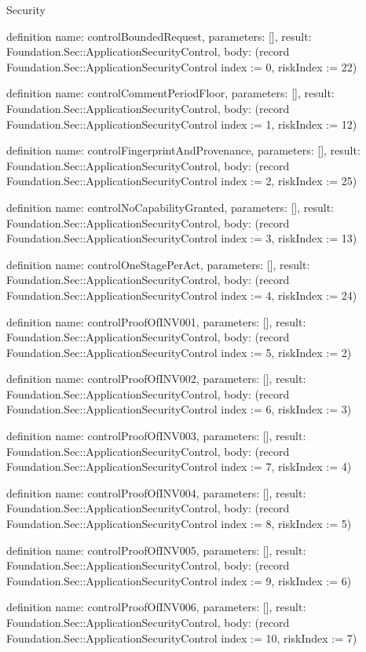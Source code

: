 \begin{lexlean}{Security}
\begin{semanticmodule}
definition{
  name: controlBoundedRequest,
  parameters: [],
  result: Foundation.Sec::ApplicationSecurityControl,
  body: (record Foundation.Sec::ApplicationSecurityControl {index := 0, riskIndex := 22})
}

definition{
  name: controlCommentPeriodFloor,
  parameters: [],
  result: Foundation.Sec::ApplicationSecurityControl,
  body: (record Foundation.Sec::ApplicationSecurityControl {index := 1, riskIndex := 12})
}

definition{
  name: controlFingerprintAndProvenance,
  parameters: [],
  result: Foundation.Sec::ApplicationSecurityControl,
  body: (record Foundation.Sec::ApplicationSecurityControl {index := 2, riskIndex := 25})
}

definition{
  name: controlNoCapabilityGranted,
  parameters: [],
  result: Foundation.Sec::ApplicationSecurityControl,
  body: (record Foundation.Sec::ApplicationSecurityControl {index := 3, riskIndex := 13})
}

definition{
  name: controlOneStagePerAct,
  parameters: [],
  result: Foundation.Sec::ApplicationSecurityControl,
  body: (record Foundation.Sec::ApplicationSecurityControl {index := 4, riskIndex := 24})
}

definition{
  name: controlProofOfINV001,
  parameters: [],
  result: Foundation.Sec::ApplicationSecurityControl,
  body: (record Foundation.Sec::ApplicationSecurityControl {index := 5, riskIndex := 2})
}

definition{
  name: controlProofOfINV002,
  parameters: [],
  result: Foundation.Sec::ApplicationSecurityControl,
  body: (record Foundation.Sec::ApplicationSecurityControl {index := 6, riskIndex := 3})
}

definition{
  name: controlProofOfINV003,
  parameters: [],
  result: Foundation.Sec::ApplicationSecurityControl,
  body: (record Foundation.Sec::ApplicationSecurityControl {index := 7, riskIndex := 4})
}

definition{
  name: controlProofOfINV004,
  parameters: [],
  result: Foundation.Sec::ApplicationSecurityControl,
  body: (record Foundation.Sec::ApplicationSecurityControl {index := 8, riskIndex := 5})
}

definition{
  name: controlProofOfINV005,
  parameters: [],
  result: Foundation.Sec::ApplicationSecurityControl,
  body: (record Foundation.Sec::ApplicationSecurityControl {index := 9, riskIndex := 6})
}

definition{
  name: controlProofOfINV006,
  parameters: [],
  result: Foundation.Sec::ApplicationSecurityControl,
  body: (record Foundation.Sec::ApplicationSecurityControl {index := 10, riskIndex := 7})
}


\end{semanticmodule}
\end{lexlean}
